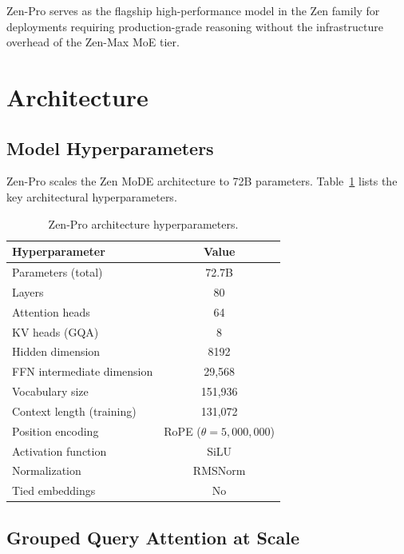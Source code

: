 \documentclass[11pt,a4paper]{article}
\begin{document}
Zen-Pro serves as the flagship high-performance model in the Zen family for deployments requiring
production-grade reasoning without the infrastructure overhead of the Zen-Max MoE tier.

\section{Architecture}

\subsection{Model Hyperparameters}

Zen-Pro scales the Zen MoDE architecture to 72B parameters. Table~\ref{tab:arch} lists the
key architectural hyperparameters.

\begin{table}[H]
\centering
\caption{Zen-Pro architecture hyperparameters.}
\label{tab:arch}
\begin{tabular}{lc}
\toprule
\textbf{Hyperparameter} & \textbf{Value} \\
\midrule
Parameters (total)           & 72.7B \\
Layers                       & 80 \\
Attention heads              & 64 \\
KV heads (GQA)               & 8 \\
Hidden dimension             & 8192 \\
FFN intermediate dimension   & 29{,}568 \\
Vocabulary size              & 151{,}936 \\
Context length (training)    & 131{,}072 \\
Position encoding            & RoPE ($\theta = 5{,}000{,}000$) \\
Activation function          & SiLU \\
Normalization                & RMSNorm \\
Tied embeddings              & No \\
\bottomrule
\end{tabular}
\end{table}

\subsection{Grouped Query Attention at Scale}
\end{document}
